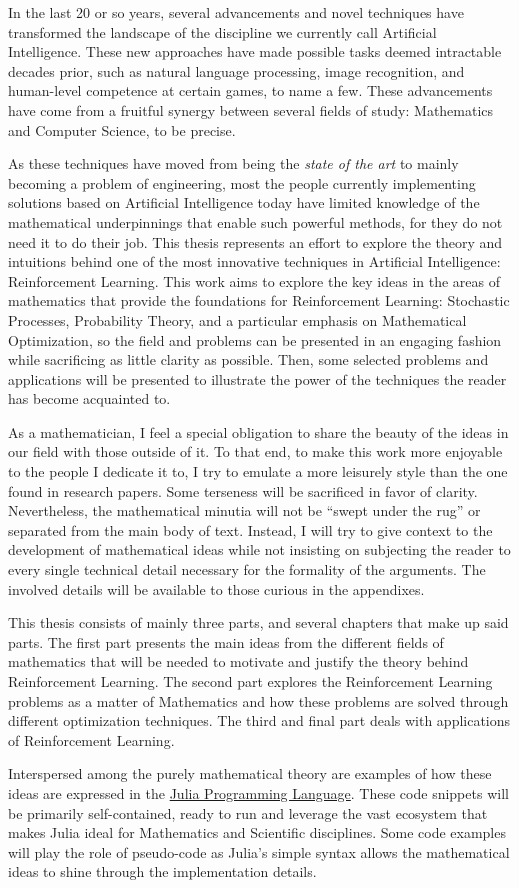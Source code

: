 In the last 20 or so years, several advancements and novel techniques have
transformed the landscape of the discipline we currently call Artificial
Intelligence. These new approaches have made possible tasks deemed intractable
decades prior, such as natural language processing, image recognition, and
human-level competence at certain games, to name a few. These advancements have
come from a fruitful synergy between several fields of study: Mathematics and
Computer Science, to be precise.

As these techniques have moved from being the \textit{state of the art} to
mainly becoming a problem of engineering, most the people currently implementing
solutions based on Artificial Intelligence today have limited knowledge of the
mathematical underpinnings that enable such powerful methods, for they do not 
need it to do their job. This thesis represents an effort to explore the theory
and intuitions behind one of the most innovative techniques in Artificial
Intelligence: Reinforcement Learning. This work aims to explore the key ideas in
the areas of mathematics that provide the foundations for Reinforcement
Learning: Stochastic Processes, Probability Theory, and a particular emphasis on
Mathematical Optimization, so the field and problems can be presented in an
engaging fashion while sacrificing as little clarity as possible. Then, some 
selected problems and applications will be presented to illustrate the power of
the techniques the reader has become acquainted to. 

As a mathematician, I feel a special obligation to share the beauty of the ideas
in our field with those outside of it. To that end, to make this work more
enjoyable to the people I dedicate it to, I try to emulate a more leisurely
style than the one found in research papers.  Some terseness will be sacrificed
in favor of clarity. Nevertheless, the mathematical minutia will not be ``swept
under the rug'' or separated from the main body of text. Instead, I will try to
give context to the development of mathematical ideas while not insisting on
subjecting the reader to every single technical detail necessary for the
formality of the arguments. The involved details will be available to those
curious in the appendixes.

This thesis consists of mainly three parts, and several chapters that make up
said parts. The first part presents the main ideas from the different fields of
mathematics that will be needed to motivate and justify the theory behind
Reinforcement Learning. The second part explores the Reinforcement Learning
problems as a matter of Mathematics and how these problems are solved through
different optimization techniques. The third and final part deals with
applications of Reinforcement Learning.

Interspersed among the purely mathematical theory are examples of how these
ideas are expressed in the \href{https://julialang.org/}{Julia Programming
Language}. These code snippets will be primarily self-contained, ready to run
and leverage the vast ecosystem that makes Julia ideal for Mathematics and
Scientific disciplines. Some code examples will play the role of pseudo-code as
Julia's simple syntax allows the mathematical ideas to shine through the
implementation details.